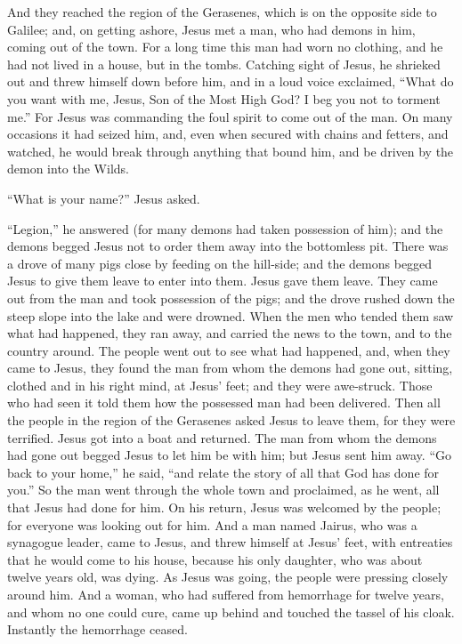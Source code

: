  And they reached the region of the Gerasenes, which is on
the opposite side to Galilee;  and, on getting ashore,
Jesus met a man, who had demons in him, coming out of the town. For a
long time this man had worn no clothing, and he had not lived in a
house, but in the tombs.  Catching sight of Jesus, he
shrieked out and threw himself down before him, and in a loud voice
exclaimed, ``What do you want with me, Jesus, Son of the Most High God?
I beg you not to torment me.''  For Jesus was commanding
the foul spirit to come out of the man. On many occasions it had seized
him, and, even when secured with chains and fetters, and watched, he
would break through anything that bound him, and be driven by the demon
into the Wilds.

 ``What is your name?'' Jesus asked.

``Legion,'' he answered (for many demons had taken possession of him);
 and the demons begged Jesus not to order them away into
the bottomless pit.  There was a drove of many pigs close
by feeding on the hill-side; and the demons begged Jesus to give them
leave to enter into them. Jesus gave them leave.  They came
out from the man and took possession of the pigs; and the drove rushed
down the steep slope into the lake and were drowned.  When
the men who tended them saw what had happened, they ran away, and
carried the news to the town, and to the country around. 
The people went out to see what had happened, and, when they came to
Jesus, they found the man from whom the demons had gone out, sitting,
clothed and in his right mind, at Jesus' feet; and they were awe-struck.
 Those who had seen it told them how the possessed man had
been delivered.  Then all the people in the region of the
Gerasenes asked Jesus to leave them, for they were terrified. Jesus got
into a boat and returned.  The man from whom the demons had
gone out begged Jesus to let him be with him; but Jesus sent him away.
 ``Go back to your home,'' he said, ``and relate the story
of all that God has done for you.'' So the man went through the whole
town and proclaimed, as he went, all that Jesus had done for him.
 On his return, Jesus was welcomed by the people; for
everyone was looking out for him.  And a man named Jairus,
who was a synagogue leader, came to Jesus, and threw himself at Jesus'
feet, with entreaties that he would come to his house, 
because his only daughter, who was about twelve years old, was dying. As
Jesus was going, the people were pressing closely around him.
 And a woman, who had suffered from hemorrhage for twelve
years, and whom no one could cure,  came up behind and
touched the tassel of his cloak. Instantly the hemorrhage ceased.


